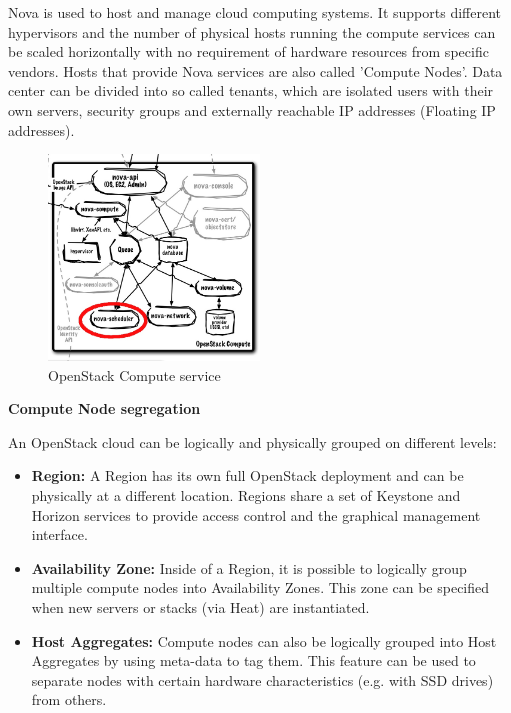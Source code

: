 Nova is used to host and manage cloud computing systems. It supports different hypervisors and the number of physical hosts running the compute services can be scaled horizontally with no requirement of hardware resources from specific vendors. Hosts that provide Nova services are also called 'Compute Nodes'. Data center can be divided into so called tenants, which are isolated users with their own servers, security groups and externally reachable IP addresses (Floating IP addresses). 

\begin{figure}[H]
\centering
\includegraphics[width=0.5\textwidth]{images/fundamentals/openstack_nova.png}
\caption{OpenStack Compute service}
\end{figure}

\textbf{Compute Node segregation}

An OpenStack cloud can be logically and physically grouped on different levels:
\begin{itemize}
\item \textbf{Region:} A Region has its own full OpenStack deployment and can be physically at a different location. Regions share a set of Keystone and Horizon services to provide access control and the graphical management interface.
\item \textbf{Availability Zone:} Inside of a Region, it is possible to logically group multiple compute nodes into Availability Zones. This zone can be specified when new servers or stacks (via Heat) are instantiated.
\item \textbf{Host Aggregates:} Compute nodes can also be logically grouped into Host Aggregates by using meta-data to tag them. This feature can be used to separate nodes with certain hardware characteristics (e.g. with SSD drives) from others.
\end{itemize}

